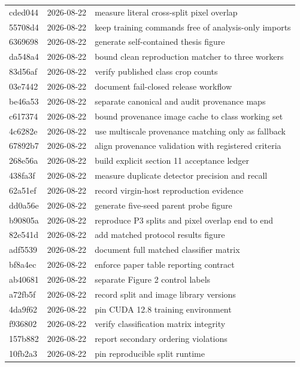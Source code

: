 \begin{longtable}{p{1.5cm}p{2.0cm}p{11.5cm}}
cded044 & 2026-08-22 & measure literal cross-split pixel overlap \\ 
55708d4 & 2026-08-22 & keep training commands free of analysis-only imports \\ 
6369698 & 2026-08-22 & generate self-contained thesis figure \\ 
da548a4 & 2026-08-22 & bound clean reproduction matcher to three workers \\ 
83d56af & 2026-08-22 & verify published class crop counts \\ 
03e7442 & 2026-08-22 & document fail-closed release workflow \\ 
be46a53 & 2026-08-22 & separate canonical and audit provenance maps \\ 
c617374 & 2026-08-22 & bound provenance image cache to class working set \\ 
4c6282e & 2026-08-22 & use multiscale provenance matching only as fallback \\ 
67892b7 & 2026-08-22 & align provenance validation with registered criteria \\ 
268e56a & 2026-08-22 & build explicit section 11 acceptance ledger \\ 
438fa3f & 2026-08-22 & measure duplicate detector precision and recall \\ 
62a51ef & 2026-08-22 & record virgin-host reproduction evidence \\ 
dd0a56e & 2026-08-22 & generate five-seed parent probe figure \\ 
b90805a & 2026-08-22 & reproduce P3 splits and pixel overlap end to end \\ 
82e541d & 2026-08-22 & add matched protocol results figure \\ 
adf5539 & 2026-08-22 & document full matched classifier matrix \\ 
bf8a4ec & 2026-08-22 & enforce paper table reporting contract \\ 
ab40681 & 2026-08-22 & separate Figure 2 control labels \\ 
a72fb5f & 2026-08-22 & record split and image library versions \\ 
4da9f62 & 2026-08-22 & pin CUDA 12.8 training environment \\ 
f936802 & 2026-08-22 & verify classification matrix integrity \\ 
157b882 & 2026-08-22 & report secondary ordering violations \\ 
10fb2a3 & 2026-08-22 & pin reproducible split runtime \\ 

\end{longtable}
